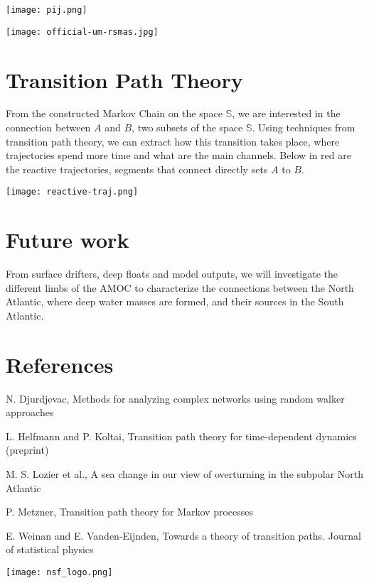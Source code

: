 \documentclass[fleqn]{betterposter}
\begin{document}
{\texttt{[image: pij.png]}

\vfill 
\texttt{[image: official-um-rsmas.jpg]} }{



\section{\color{miamifushia} Transition Path Theory} From the constructed Markov Chain on the space $\mathbb{S}$, we are interested in the connection between $A$ and $B$, two subsets of the space $\mathbb{S}$. Using techniques from transition path theory, we can extract how this transition takes place, where trajectories spend more time and what are the main channels. Below in red are the reactive trajectories, segments that connect directly sets $A$ to $B$.

\texttt{[image: reactive-traj.png]}


\section{\color{miamifushia} Future work} From surface drifters, deep floats and model outputs, we will investigate the different limbs of the AMOC to characterize the connections between the North Atlantic, where deep water masses are formed, and their sources in the South Atlantic.


\section{\color{miamifushia} References} N. Djurdjevac, Methods for analyzing complex networks using random walker approaches

\vspace{0.15em} L. Helfmann and P. Koltai, Transition path theory for time-dependent dynamics (preprint)

\vspace{0.15em} M. S. Lozier et al., A sea change in our view of overturning in the subpolar North Atlantic

\vspace{0.15em} P. Metzner, Transition path theory for Markov processes

\vspace{0.15em} E. Weinan and E. Vanden-Eijnden, Towards a theory of transition paths. Journal of statistical physics

\vfill

\begin{center}
	\texttt{[image: nsf\_logo.png]} 
\end{center}
} 
\end{document}
